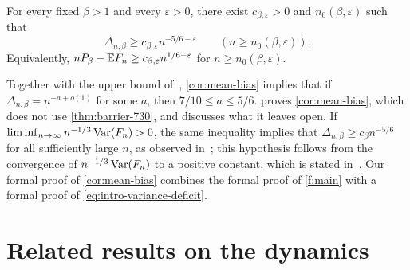 \begin{corollary}\label{cor:mean-bias}
For every fixed $\beta>1$ and every $\varepsilon>0$, there exist
$c_{\beta,\varepsilon}>0$ and $n_0(\beta,\varepsilon)$ such that
\begin{equation}\label{eq:mean-bias-lower}
 \Delta_{n,\beta}\ge c_{\beta,\varepsilon}n^{-5/6-\varepsilon}
 \qquad(n\ge n_0(\beta,\varepsilon)).
\end{equation}
Equivalently, $nP_\beta-\mathbb E F_n\ge c_{\beta,\varepsilon}n^{1/6-\varepsilon}$ for
$n\ge n_0(\beta,\varepsilon)$.
\end{corollary}

Together with the upper bound of~\cite{hexagon-bias}, \cref{cor:mean-bias}
implies that if $\Delta_{n,\beta}=n^{-a+o(1)}$ for some $a$, then
$7/10\le a\le5/6$.  proves \cref{cor:mean-bias}, which does
not use \cref{thm:barrier-730}, and discusses what it leaves open. If
$\liminf_{n\to\infty}n^{-1/3}\operatorname{Var}(F_n)>0$, the same inequality implies that
$\Delta_{n,\beta}\ge c_\beta n^{-5/6}$ for all sufficiently large $n$, as
observed in~\cite[Section~1.6, equation~(1.4)]{hexagon-bias}; this
hypothesis follows from the convergence of $n^{-1/3}\operatorname{Var}(F_n)$ to a positive
constant, which is stated in~\cite[Theorem~1.2]{oai-limiting-law}. Our formal
proof of \cref{cor:mean-bias} combines the formal proof of \cref{f:main}
with a formal proof of \eqref{eq:intro-variance-deficit}.

\section{Related results on the dynamics}\label{sec:intro-dynamics}

